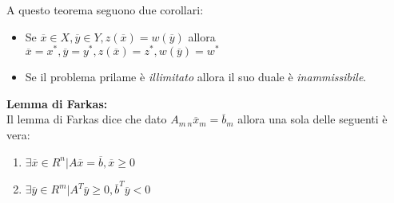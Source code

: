 \documentclass{article}
\begin{document}
A questo teorema seguono due corollari:
\begin{itemize}
  \item Se $\overline{x} \in X, \overline{y} \in Y, z(\overline{x})=w(\overline{y})$ allora $\overline{x}=x^{\ast}, \overline{y}=y^{\ast}, z(\overline{x})=z^{\ast}, w(\overline{y})=w^{\ast}$
  \item Se il problema prilame è \textit{illimitato} allora il suo duale è \textit{inammissibile}.
\end{itemize}
\textbf{Lemma di Farkas:}\\
Il lemma di Farkas dice che dato $A_{m\ n}\overline{x}_m=\overline{b}_m$ allora una sola delle seguenti è vera:
\begin{enumerate}
  \item $\exists\overline{x} \in R^n|A\overline{x}=\overline{b}, \overline{x}\ge 0$
  \item $\exists\overline{y} \in R^m|A^T\overline{y}\ge 0, \overline{b}^T\overline{y} < 0$
\end{enumerate}
\end{document}
